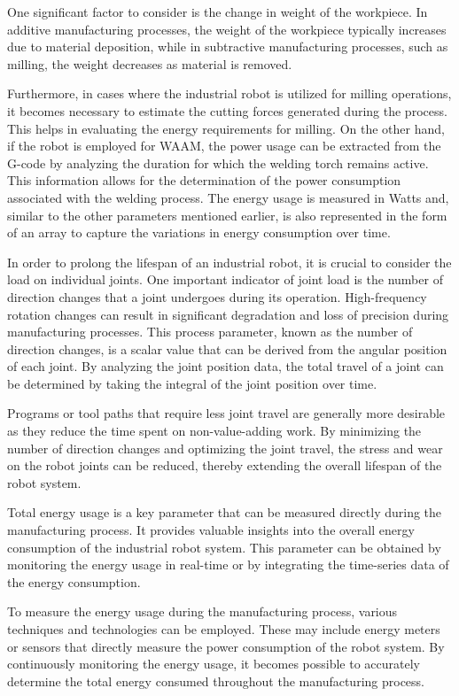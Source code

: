 One significant factor to consider is the change in weight of the workpiece. In additive manufacturing processes, the weight of the workpiece typically increases due to material deposition, while in subtractive manufacturing processes, such as milling, the weight decreases as material is removed.

Furthermore, in cases where the industrial robot is utilized for milling operations, it becomes necessary to estimate the cutting forces generated during the process. This helps in evaluating the energy requirements for milling. On the other hand, if the robot is employed for WAAM, the power usage can be extracted from the G-code by analyzing the duration for which the welding torch remains active. This information allows for the determination of the power consumption associated with the welding process. The energy usage is measured in Watts and, similar to the other parameters mentioned earlier, is also represented in the form of an array to capture the variations in energy consumption over time.

In order to prolong the lifespan of an industrial robot, it is crucial to consider the load on individual joints. One important indicator of joint load is the number of direction changes that a joint undergoes during its operation. High-frequency rotation changes can result in significant degradation and loss of precision during manufacturing processes.
This process parameter, known as the number of direction changes, is a scalar value that can be derived from the angular position of each joint. By analyzing the joint position data, the total travel of a joint can be determined by taking the integral of the joint position over time.

Programs or tool paths that require less joint travel are generally more desirable as they reduce the time spent on non-value-adding work. By minimizing the number of direction changes and optimizing the joint travel, the stress and wear on the robot joints can be reduced, thereby extending the overall lifespan of the robot system.

Total energy usage is a key parameter that can be measured directly during the manufacturing process. It provides valuable insights into the overall energy consumption of the industrial robot system. This parameter can be obtained by monitoring the energy usage in real-time or by integrating the time-series data of the energy consumption.

To measure the energy usage during the manufacturing process, various techniques and technologies can be employed. These may include energy meters or sensors that directly measure the power consumption of the robot system. By continuously monitoring the energy usage, it becomes possible to accurately determine the total energy consumed throughout the manufacturing process.

